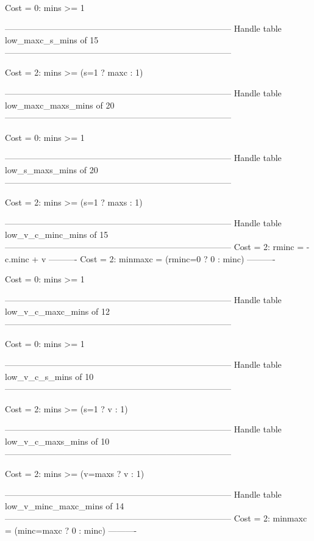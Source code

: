 Cost =  0:  mins >= 1

--------------------------------------------------------------------------------
Handle table low_maxc_s_mins of 15
--------------------------------------------------------------------------------

Cost =  2:  mins >= (s=1 ? maxc : 1)

--------------------------------------------------------------------------------
Handle table low_maxc_maxs_mins of 20
--------------------------------------------------------------------------------

Cost =  0:  mins >= 1

--------------------------------------------------------------------------------
Handle table low_s_maxs_mins of 20
--------------------------------------------------------------------------------

Cost =  2:  mins >= (s=1 ? maxs : 1)

--------------------------------------------------------------------------------
Handle table low_v_c_minc_mins of 15
--------------------------------------------------------------------------------
Cost =  2:  rminc   = -c.minc + v
----------
Cost =  2:  minmaxc = (rminc=0 ? 0 : minc)
----------

Cost =  0:  mins >= 1

--------------------------------------------------------------------------------
Handle table low_v_c_maxc_mins of 12
--------------------------------------------------------------------------------

Cost =  0:  mins >= 1

--------------------------------------------------------------------------------
Handle table low_v_c_s_mins of 10
--------------------------------------------------------------------------------

Cost =  2:  mins >= (s=1 ? v : 1)

--------------------------------------------------------------------------------
Handle table low_v_c_maxs_mins of 10
--------------------------------------------------------------------------------

Cost =  2:  mins >= (v=maxs ? v : 1)

--------------------------------------------------------------------------------
Handle table low_v_minc_maxc_mins of 14
--------------------------------------------------------------------------------
Cost =  2:  minmaxc = (minc=maxc ? 0 : minc)
----------

